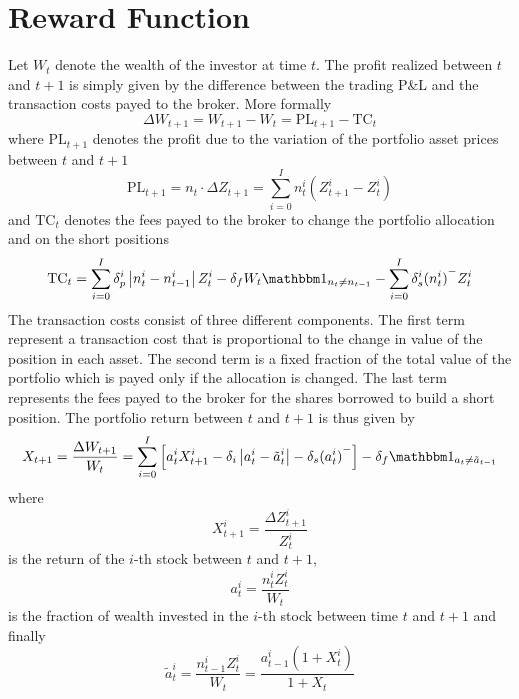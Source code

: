 \section{Reward Function}
Let $W_t$ denote the wealth of the investor at time $t$. The profit realized
between $t$ and $t+1$ is simply given by the difference between the trading
P\&L and the transaction costs payed to the broker. More formally
\begin{equation*}
	\Delta W_{t+1} = W_{t+1} - W_t = \text{PL}_{t+1} - \text{TC}_{t}	
\end{equation*}
where $\text{PL}_{t+1}$ denotes the profit due to the variation of the
portfolio asset prices between $t$ and $t+1$
\begin{equation*}
	\text{PL}_{t+1} = {n}_t \cdot \Delta{Z}_{t+1} = \sum^{I}_{i=0} 
	n_t^i (Z_{t+1}^i - Z_t^i) 
\end{equation*}
and $\text{TC}_t$ denotes the fees payed to the broker to change the portfolio
allocation and on the short positions
\begin{equation*}
	\text{TC}_t = \sum^{I}_{i=0} \delta_p^i \left| n_t^i - n_{t-1}^i\right| Z_t^i 
				- \delta_f W_t \ind{{n}_t \neq {n}_{t-1}} 
				- \sum^{I}_{i=0} \delta_s^i {(n_t^i)}^{-} Z_t^i
\end{equation*}
The transaction costs consist of three different components. The first term 
represent a transaction cost that is proportional to the change in value of the 
position in each asset. The second term is a fixed fraction of the total value
of the portfolio which is payed only if the allocation is changed. The last
term represents the fees payed to the broker for the shares borrowed to build a
short position. The portfolio return between $t$ and $t+1$ is thus given by
\begin{equation}\label{eq:portfolio_return}
	X_{t+1} = \frac{\Delta W_{t+1}}{W_t} = \sum^{I}_{i=0} \left[ a_t^i
	X_{t+1}^i - \delta_i \left| a_t^i - \tilde{a}_t^i \right| - \delta_s
	{(a_t^i)}^- \right] - \delta_f \ind{{a}_t \neq \tilde{{a}}_{t-1}}  
\end{equation}
where 
\begin{equation*}
	X_{t+1}^i = \frac{\Delta Z_{t+1}^i}{Z_t^i}
\end{equation*}
is the return of the $i$-th stock between $t$ and $t+1$, 
\begin{equation*}
	a_t^i = \frac{n_t^i Z_t^i}{W_t}
\end{equation*}
is the fraction of wealth invested in the $i$-th stock between time $t$ and
$t+1$ and finally 
\begin{equation*}
	\tilde{a}_t^i = \frac{n_{t-1}^i Z_t^i}{W_t} = \frac{a_{t-1}^i (1+X_t^i)}
	{1 + X_t}
\end{equation*}
